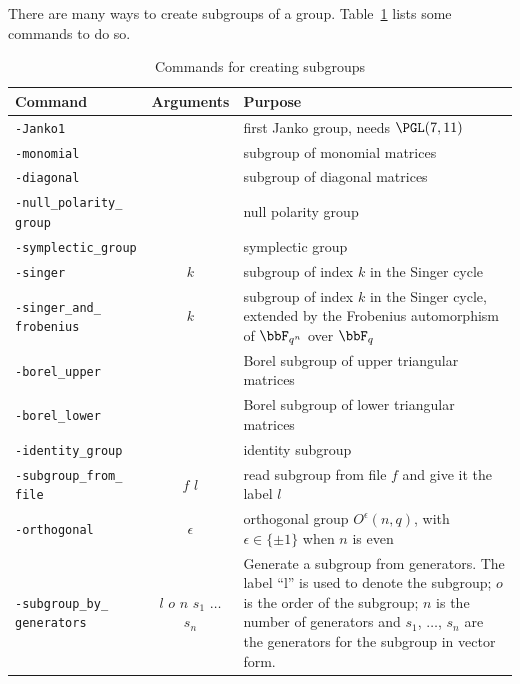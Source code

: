 There are many ways to create subgroups of a group.
Table~\ref{tab:subgroups} lists some commands to do so.
\begin{table}
\begin{center}
\begin{tabular}{|p{4cm}|c|p{8cm}|}
\hline
Command & Arguments & Purpose \\
\hline
\hline
\verb'-Janko1' &  & first Janko group, needs $\PGL(7,11)$ \\
\hline
\verb'-monomial' &  & subgroup of monomial matrices \\
\hline
\verb'-diagonal' &  & subgroup of diagonal matrices \\
\hline
\verb'-null_polarity_' \verb'group' & & null polarity group \\
\hline
\verb'-symplectic_group' & & symplectic group \\
\hline
\verb'-singer' & $k$ & subgroup of index $k$ in the Singer cycle \\
\hline
\verb'-singer_and_' \verb'frobenius' & $k$ & subgroup of index $k$ in the Singer cycle, 
extended by the Frobenius automorphism of $\bbF_{q^n}$ over $\bbF_q$ \\
\hline
\verb'-borel_upper' &  & Borel subgroup of upper triangular matrices \\
\hline
\verb'-borel_lower' &  & Borel subgroup of lower triangular matrices \\
\hline
\verb'-identity_group' &  & identity subgroup \\
\hline
\verb'-subgroup_from_' \verb'file' & $f$ $l$ & read subgroup from file $f$ and give it the label $l$\\
\hline
\verb'-orthogonal' & $\epsilon$ & orthogonal group $O^\epsilon(n,q)$, 
with $\epsilon  \in \{ \pm 1 \}$ when $n$ is even\\
\hline
\verb'-subgroup_by_' \verb'generators' & $l$ $o$ $n$ $s_1$ $\ldots$ $s_n$ & Generate a subgroup from generators. 
The label ``l'' is used to denote the subgroup; $o$ is the order of the subgroup; 
$n$ is the number of generators and $s_1$, $\ldots$, $s_n$ 
are the generators for the subgroup in vector form. \\
\hline
\end{tabular}
\end{center}
\caption{\label{tab:subgroups}Commands for creating subgroups}
\end{table}



